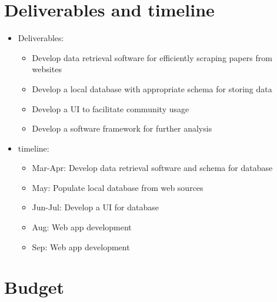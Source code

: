 \documentclass{article}[12pt,preprint]
\begin{document}
\newpage
\section{Deliverables and timeline}

\begin{itemize}

\item Deliverables:

  \begin{itemize}
  \item Develop data retrieval software for efficiently scraping papers from websites
  \item Develop a local database with appropriate schema for storing data
  \item Develop a UI to facilitate community usage
  \item Develop a software framework for further analysis
  \end{itemize}

\item timeline:

  \begin{itemize}
  \item Mar-Apr: Develop data retrieval software and schema for database
  \item May: Populate local database from web sources
  \item Jun-Jul: Develop a UI for database 
  \item Aug: Web app development
  \item Sep: Web app development
  \end{itemize}

\end{itemize}


\newpage
\section{Budget}
\end{document}
